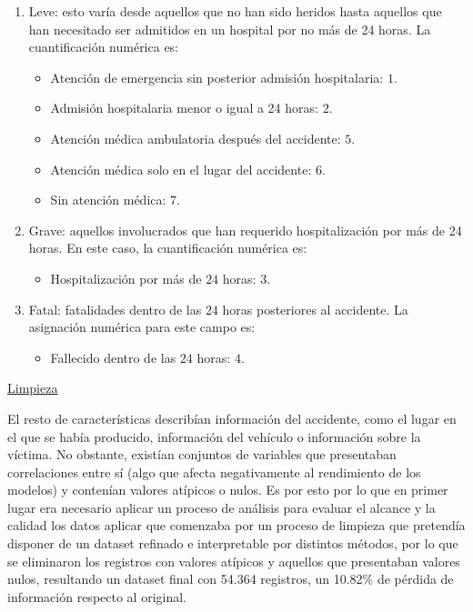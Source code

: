 \documentclass{uathesis-es}
\begin{document}
{\begin{enumerate}
	\item Leve: esto varía desde aquellos que no han sido heridos hasta aquellos que han necesitado ser admitidos en un hospital por no más de 24 horas. La cuantificación numérica es:
	\begin{itemize}
		\item Atención de emergencia sin posterior admisión hospitalaria: $1$.
		\item Admisión hospitalaria menor o igual a 24 horas: $2$.
		\item Atención médica ambulatoria después del accidente: $5$.
		\item Atención médica solo en el lugar del accidente: $6$.
		\item Sin atención médica: $7$.
	\end{itemize}
	\item Grave: aquellos involucrados que han requerido hospitalización por más de 24 horas. En este caso, la cuantificación numérica es:
	\begin{itemize}
		\item Hospitalización por más de $24$ horas: $3$.
	\end{itemize}
	\item Fatal: fatalidades dentro de las $24$ horas posteriores al accidente. La asignación numérica para este campo es:
	\begin{itemize}
		\item Fallecido dentro de las $24$ horas: $4$.
	\end{itemize}
\end{enumerate}

\underline{Limpieza}
	
El resto de características describían información del accidente, como el lugar en el que se había producido, información del vehículo o información sobre la víctima. No obstante, existían conjuntos de variables que presentaban correlaciones entre sí (algo que afecta negativamente al rendimiento de los modelos) y contenían valores atípicos o nulos. Es por esto por lo que en primer lugar era necesario aplicar un proceso de análisis para evaluar el alcance y la calidad los datos aplicar que comenzaba por un proceso de limpieza que pretendía disponer de un dataset refinado e interpretable por distintos métodos, por lo que se eliminaron los registros con valores atípicos y aquellos que presentaban valores nulos, resultando un dataset final con 54.364 registros, un 10.82\% de pérdida de información respecto al original.


}
\end{document}
